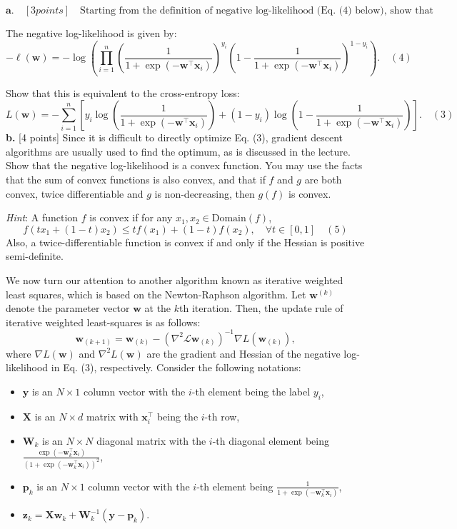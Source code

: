 \documentclass[a3paper,12pt]{extarticle} %
\begin{document}
\[
\textbf{a.} \quad [3 points] \quad \text{Starting from the definition of negative log-likelihood (Eq. (4) below), show that it is equal to the cross-entropy loss (Eq. (3)).}
\]

The negative log-likelihood is given by:
\[
-\ell(\mathbf{w}) = -\log \left( \prod_{i=1}^n \left( \frac{1}{1 + \exp(-\mathbf{w}^\top \mathbf{x}_i)} \right)^{y_i} \left( 1 - \frac{1}{1 + \exp(-\mathbf{w}^\top \mathbf{x}_i)} \right)^{1 - y_i} \right). \quad (4)
\]

Show that this is equivalent to the cross-entropy loss:
\[
L(\mathbf{w}) = -\sum_{i=1}^n \left[ y_i \log \left( \frac{1}{1 + \exp(-\mathbf{w}^\top \mathbf{x}_i)} \right) + (1 - y_i) \log \left( 1 - \frac{1}{1 + \exp(-\mathbf{w}^\top \mathbf{x}_i)} \right) \right]. \quad (3)
\]
\textbf{b.} [4 points] Since it is difficult to directly optimize Eq. (3), gradient descent algorithms are usually used to find the optimum, as is discussed in the lecture. Show that the negative log-likelihood is a convex function. You may use the facts that the sum of convex functions is also convex, and that if $f$ and $g$ are both convex, twice differentiable and $g$ is non-decreasing, then $g(f)$ is convex.

\textit{Hint}: A function $f$ is convex if for any $x_1, x_2 \in \text{Domain}(f)$,
\[
f(tx_1 + (1 - t)x_2) \leq t f(x_1) + (1 - t) f(x_2), \quad \forall t \in [0, 1] \quad (5)
\]
Also, a twice-differentiable function is convex if and only if the Hessian is positive semi-definite.

We now turn our attention to another algorithm known as iterative weighted least squares, which is based on the Newton-Raphson algorithm. Let $\mathbf{w}^{(k)}$ denote the parameter vector $\mathbf{w}$ at the $k$th iteration. Then, the update rule of iterative weighted least-squares is as follows:
\[
\mathbf{w}_{(k+1)} = \mathbf{w}_{(k)} - \left( \nabla^2\mathcal{L}\mathbf{w}_{(k)} \right)^{-1} \nabla L(\mathbf{w}_{(k)}),
\]
where \( \nabla L(\mathbf{w}) \) and \( \nabla^2 L(\mathbf{w}) \) are the gradient and Hessian of the negative log-likelihood in Eq. (3), respectively. Consider the following notations:
\begin{itemize}
    \item \( \mathbf{y} \) is an \( N \times 1 \) column vector with the \( i \)-th element being the label \( y_i \),
    \item \( \mathbf{X} \) is an \( N \times d \) matrix with \( \mathbf{x}_i^\top \) being the \( i \)-th row,
    \item \( \mathbf{W}_k \) is an \( N \times N \) diagonal matrix with the \( i \)-th diagonal element being \( \frac{\exp(-\mathbf{w}_k^\top \mathbf{x}_i)}{(1 + \exp(-\mathbf{w}_k^\top \mathbf{x}_i))^2} \),
    \item \( \mathbf{p}_k \) is an \( N \times 1 \) column vector with the \( i \)-th element being \( \frac{1}{1 + \exp(-\mathbf{w}_k^\top \mathbf{x}_i)} \),
    \item \( \mathbf{z}_k = \mathbf{X} \mathbf{w}_k + \mathbf{W}_k^{-1} (\mathbf{y} - \mathbf{p}_k) \).
\end{itemize}
\end{document}
